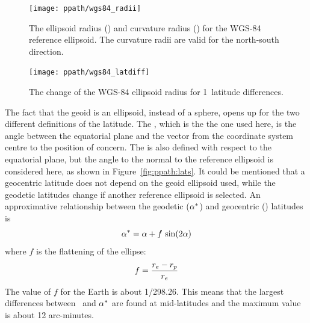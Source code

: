 \begin{figure}[!p]
 \begin{minipage}[c]{0.65\textwidth}
 \texttt{[image: ppath/wgs84\_radii]}
 \end{minipage}%
 \begin{minipage}[c]{0.35\textwidth}
  \caption{The ellipsoid radius (\aRds{\odot}) and curvature radius ()
    for the
    WGS-84 reference ellipsoid. The curvature radii are valid for the
    north-south direction.}
  \label{fig:ppath:wgs84radii}
 \end{minipage}%
\end{figure}   
        
\begin{figure}[!p]
 \begin{minipage}[c]{0.65\textwidth}
 \texttt{[image: ppath/wgs84\_latdiff]}
 \end{minipage}%
 \begin{minipage}[c]{0.35\textwidth}
  \caption{The change of the WGS-84 ellipsoid radius for  1\degree\ 
            latitude differences.}
  \label{fig:ppath:latdiff}
 \end{minipage}%
\end{figure}   



\label{sec:ppath:geolat}

The fact that the geoid is an ellipsoid, instead of a sphere, opens up
for the two different definitions of the latitude. The
, which is the the one used here, is the
angle between the equatorial plane and the vector from the coordinate
system centre to the position of concern. The \textindex{geodetic
  latitude} is also defined with respect to the equatorial plane, but
the angle to the normal to the reference ellipsoid is considered here, as
shown in Figure~\ref{fig:ppath:lats}. It could be mentioned that a
geocentric latitude does not depend on the geoid ellipsoid used, while
the geodetic latitudes change if another reference ellipsoid is
selected. An approximative relationship between the geodetic
($\alpha^*$) and geocentric (\Lat) latitudes is \citep{montenbruck:00}
\begin{equation}
 \alpha^* = \alpha + f\,\sin(2\alpha)  
 \label{eq:ppath:lats}
\end{equation}
where $f$ is the flattening of the ellipse:
\begin{equation}
 f = \frac{r_{e}-r_{p}}{r_{e}}
 \label{eq:ppath:flattening}
\end{equation}
The value of $f$ for the Earth is about 1/298.26. This means that the
largest differences between \Lat\ and $\alpha^*$ are found at
mid-latitudes and the maximum value is about 12 arc-minutes.

